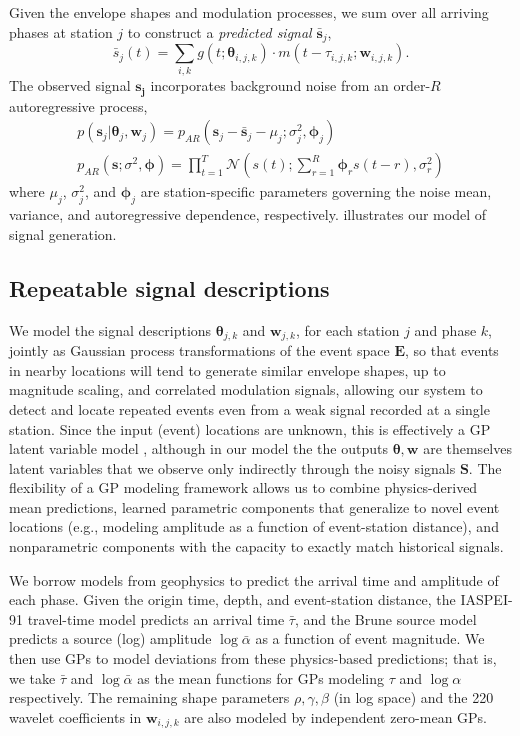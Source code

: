 \documentclass[twoside]{article} \usepackage{aistats2017}
\newcommand{\N}{\mathcal{N}}
\renewcommand{\v}[1]{\mathbf{#1}}
\begin{document}
Given the envelope shapes and modulation processes, we sum over all
arriving phases at station $j$ to construct a {\em predicted signal} $\v{\bar{s}}_j$,
\begin{equation}
\bar{s}_j(t) = \sum_{i, k} g(t; \v{\theta}_{i,j,k})\cdot m(t-\tau_{i,j,k}; \v{w}_{i,j,k}).
\end{equation}
The observed signal $\v{s_j}$ incorporates background noise from an
order-$R$ autoregressive process,
\begin{align}
p(\v{s}_j | \v{\theta}_j, \v{w}_j) = p_{AR}(\v{s}_j - \v{\bar{s}}_j - \mu_j;
\sigma^2_j, \v{\phi}_j)\\
p_{AR}(\v{s}; \sigma^2, \v{\phi}) = \prod_{t=1}^T \N\left(s(t);
\sum_{r=1}^R \v{\phi}_r s(t-r), \sigma^2_r\right)\nonumber
\end{align}
where $\mu_j$, $\sigma^2_j$, and $\v{\phi}_j$ are station-specific
parameters governing the noise mean, variance, and autoregressive
dependence, respectively.  illustrates our model of
signal generation. 

\subsection{Repeatable signal descriptions}

We model the signal
descriptions $\v{\theta}_{j,k}$ and $\v{w}_{j,k}$, for each station
$j$ and phase $k$, jointly as Gaussian process \citep{rasmussen2006}
transformations of the event space $\v{E}$, so that events in
nearby locations will tend to generate similar envelope shapes, up to
magnitude scaling, and correlated modulation signals, allowing our system to
detect and locate repeated events even from a weak signal recorded at a single
station. Since the input (event) locations are unknown, this is effectively a
GP latent variable model \citep{gplvm}, although in our model the
the outputs $\v{\theta}, \v{w}$ are themselves latent
variables that we observe only indirectly through the noisy signals $\v{S}$. The flexibility
of a GP modeling framework allows us to combine physics-derived mean
predictions, learned parametric components that generalize to novel event
locations (e.g., modeling amplitude as a function of event-station
distance), and nonparametric components with the capacity to exactly
match historical signals. 

We borrow models from geophysics to predict the arrival time and
amplitude of each phase. Given the origin time, depth, and
event-station distance, the IASPEI-91 \citep{iaspei91} travel-time
model predicts an arrival time $\bar{\tau}$, and the Brune
source model \citep{brune} predicts a source (log) amplitude
$\log \bar{\alpha}$ as a function of event magnitude. We then use
GPs to model deviations from these physics-based predictions; that is,
we take $\bar{\tau}$ and $\log \bar{\alpha}$ as the
mean functions for GPs modeling $\tau$ and $\log
\alpha$ respectively. The remaining shape parameters $\rho, \gamma,
\beta$ (in log space) and the 220 wavelet coefficients in $\v{w}_{i,j,k}$ are also
modeled by independent zero-mean GPs. 
\end{document}
